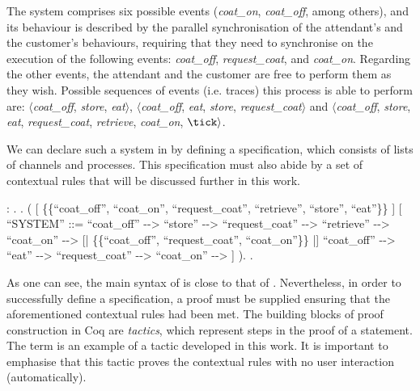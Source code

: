 The system comprises six possible events (\emph{coat\_on}, \emph{coat\_off}, among others), and its behaviour is described by the parallel synchronisation of the attendant's and the customer's behaviours, requiring that they need to synchronise on the execution of the following events: \emph{coat\_off}, \emph{request\_coat}, and \emph{coat\_on}. Regarding the other events, the attendant and the customer are free to perform them as they wish. Possible sequences of events (i.e. traces) this process is able to perform are: $ \langle $\emph{coat\_off}, \emph{store}, \emph{eat}$ \rangle $, $ \langle $\emph{coat\_off}, \emph{eat}, \emph{store}, \emph{request\_coat}$ \rangle $ and $ \langle $\emph{coat\_off}, \emph{store}, \emph{eat}, \emph{request\_coat}, \emph{retrieve}, \emph{coat\_on}, $ \tick \rangle $.

We can declare such a system in \CSPcoq{} by defining a specification, which consists of lists of channels and processes. This specification must also abide by a set of contextual rules that will be discussed further in this work.

\begin{coqdoccode}
	\coqdocnoindent
	  : .\coqdoceol
	\coqdocnoindent
	.\coqdoceol
	\coqdocindent{1.00em}
	 (\coqdoceol
	\coqdocindent{2.00em}
	\coqdoceol
	\coqdocindent{2.00em}
	[  \{\{``coat\_off'', ``coat\_on'', ``request\_coat'', ``retrieve'', ``store'', ``eat''\}\} ]\coqdoceol
	\coqdocindent{2.00em}
	[ ``SYSTEM'' ::=\coqdoceol
	\coqdocindent{3.00em}
	``coat\_off'' -{}-> ``store'' -{}-> ``request\_coat'' -{}-> ``retrieve'' -{}-> ``coat\_on'' -{}-> \coqdoceol
	\coqdocindent{3.00em}
	[| \{\{``coat\_off'', ``request\_coat'', ``coat\_on''\}\} |]\coqdoceol
	\coqdocindent{3.00em}
	``coat\_off'' -{}-> ``eat'' -{}-> ``request\_coat'' -{}-> ``coat\_on'' -{}->  ]\coqdoceol
	\coqdocindent{1.00em}
	).\coqdoceol
	\coqdocnoindent
	.\coqdoceol
\end{coqdoccode}

As one can see, the main syntax of \CSPcoq{} is close to that of \CSPM{}. Nevertheless, in order to successfully define a specification, a proof must be supplied ensuring that the aforementioned contextual rules had been met. The building blocks of proof construction in Coq are \emph{tactics}, which represent steps in the proof of a statement. The term  is an example of a tactic developed in this work. It is important to emphasise that this tactic proves the contextual rules with no user interaction (automatically).

